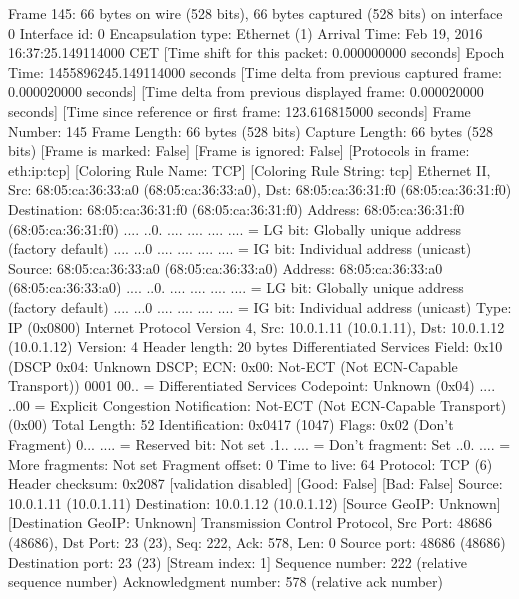 Frame 145: 66 bytes on wire (528 bits), 66 bytes captured (528 bits) on interface 0
    Interface id: 0
    Encapsulation type: Ethernet (1)
    Arrival Time: Feb 19, 2016 16:37:25.149114000 CET
    [Time shift for this packet: 0.000000000 seconds]
    Epoch Time: 1455896245.149114000 seconds
    [Time delta from previous captured frame: 0.000020000 seconds]
    [Time delta from previous displayed frame: 0.000020000 seconds]
    [Time since reference or first frame: 123.616815000 seconds]
    Frame Number: 145
    Frame Length: 66 bytes (528 bits)
    Capture Length: 66 bytes (528 bits)
    [Frame is marked: False]
    [Frame is ignored: False]
    [Protocols in frame: eth:ip:tcp]
    [Coloring Rule Name: TCP]
    [Coloring Rule String: tcp]
Ethernet II, Src: 68:05:ca:36:33:a0 (68:05:ca:36:33:a0), Dst: 68:05:ca:36:31:f0 (68:05:ca:36:31:f0)
    Destination: 68:05:ca:36:31:f0 (68:05:ca:36:31:f0)
        Address: 68:05:ca:36:31:f0 (68:05:ca:36:31:f0)
        .... ..0. .... .... .... .... = LG bit: Globally unique address (factory default)
        .... ...0 .... .... .... .... = IG bit: Individual address (unicast)
    Source: 68:05:ca:36:33:a0 (68:05:ca:36:33:a0)
        Address: 68:05:ca:36:33:a0 (68:05:ca:36:33:a0)
        .... ..0. .... .... .... .... = LG bit: Globally unique address (factory default)
        .... ...0 .... .... .... .... = IG bit: Individual address (unicast)
    Type: IP (0x0800)
Internet Protocol Version 4, Src: 10.0.1.11 (10.0.1.11), Dst: 10.0.1.12 (10.0.1.12)
    Version: 4
    Header length: 20 bytes
    Differentiated Services Field: 0x10 (DSCP 0x04: Unknown DSCP; ECN: 0x00: Not-ECT (Not ECN-Capable Transport))
        0001 00.. = Differentiated Services Codepoint: Unknown (0x04)
        .... ..00 = Explicit Congestion Notification: Not-ECT (Not ECN-Capable Transport) (0x00)
    Total Length: 52
    Identification: 0x0417 (1047)
    Flags: 0x02 (Don't Fragment)
        0... .... = Reserved bit: Not set
        .1.. .... = Don't fragment: Set
        ..0. .... = More fragments: Not set
    Fragment offset: 0
    Time to live: 64
    Protocol: TCP (6)
    Header checksum: 0x2087 [validation disabled]
        [Good: False]
        [Bad: False]
    Source: 10.0.1.11 (10.0.1.11)
    Destination: 10.0.1.12 (10.0.1.12)
    [Source GeoIP: Unknown]
    [Destination GeoIP: Unknown]
Transmission Control Protocol, Src Port: 48686 (48686), Dst Port: 23 (23), Seq: 222, Ack: 578, Len: 0
    Source port: 48686 (48686)
    Destination port: 23 (23)
    [Stream index: 1]
    Sequence number: 222    (relative sequence number)
    Acknowledgment number: 578    (relative ack number)
